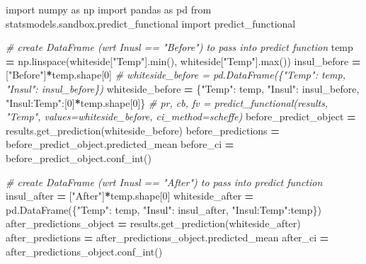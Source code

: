 \documentclass[
]{book}
\newenvironment{Shaded}{\begin{snugshade}}{\end{snugshade}}
\newcommand{\BuiltInTok}[1]{#1}
\newcommand{\CommentTok}[1]{\textcolor[rgb]{0.56,0.35,0.01}{\textit{#1}}}
\newcommand{\DecValTok}[1]{\textcolor[rgb]{0.00,0.00,0.81}{#1}}
\newcommand{\ImportTok}[1]{#1}
\newcommand{\NormalTok}[1]{#1}
\newcommand{\OperatorTok}[1]{\textcolor[rgb]{0.81,0.36,0.00}{\textbf{#1}}}
\newcommand{\StringTok}[1]{\textcolor[rgb]{0.31,0.60,0.02}{#1}}
\begin{document}
\begin{Shaded}
\begin{Highlighting}[]
\ImportTok{import}\NormalTok{ numpy }\ImportTok{as}\NormalTok{ np}
\ImportTok{import}\NormalTok{ pandas }\ImportTok{as}\NormalTok{ pd}
\ImportTok{from}\NormalTok{ statsmodels.sandbox.predict\_functional }\ImportTok{import}\NormalTok{ predict\_functional}

\CommentTok{\# create DataFrame (wrt Inusl == "Before") to pass into predict function}
\NormalTok{temp }\OperatorTok{=}\NormalTok{ np.linspace(whiteside[}\StringTok{"Temp"}\NormalTok{].}\BuiltInTok{min}\NormalTok{(), whiteside[}\StringTok{"Temp"}\NormalTok{].}\BuiltInTok{max}\NormalTok{())}
\NormalTok{insul\_before }\OperatorTok{=}\NormalTok{ [}\StringTok{"Before"}\NormalTok{]}\OperatorTok{*}\NormalTok{temp.shape[}\DecValTok{0}\NormalTok{]}
\CommentTok{\# whiteside\_before = pd.DataFrame(\{"Temp": temp, "Insul": insul\_before\})}
\NormalTok{whiteside\_before }\OperatorTok{=}\NormalTok{ \{}\StringTok{"Temp"}\NormalTok{: temp, }\StringTok{"Insul"}\NormalTok{: insul\_before, }\StringTok{"Insul:Temp"}\NormalTok{:[}\DecValTok{0}\NormalTok{]}\OperatorTok{*}\NormalTok{temp.shape[}\DecValTok{0}\NormalTok{]\}}
\CommentTok{\# pr, cb, fv = predict\_functional(results, "Temp", values=whiteside\_before, ci\_method=\textquotesingle{}scheffe\textquotesingle{})}
\NormalTok{before\_predict\_object }\OperatorTok{=}\NormalTok{ results.get\_prediction(whiteside\_before)}
\NormalTok{before\_predictions }\OperatorTok{=}\NormalTok{ before\_predict\_object.predicted\_mean}
\NormalTok{before\_ci }\OperatorTok{=}\NormalTok{ before\_predict\_object.conf\_int()}

\CommentTok{\# create DataFrame (wrt Inusl == "After") to pass into predict function}
\NormalTok{insul\_after }\OperatorTok{=}\NormalTok{ [}\StringTok{"After"}\NormalTok{]}\OperatorTok{*}\NormalTok{temp.shape[}\DecValTok{0}\NormalTok{]}
\NormalTok{whiteside\_after }\OperatorTok{=}\NormalTok{ pd.DataFrame(\{}\StringTok{"Temp"}\NormalTok{: temp, }\StringTok{"Insul"}\NormalTok{: insul\_after, }\StringTok{"Insul:Temp"}\NormalTok{:temp\})}
\NormalTok{after\_predictions\_object }\OperatorTok{=}\NormalTok{ results.get\_prediction(whiteside\_after)}
\NormalTok{after\_predictions }\OperatorTok{=}\NormalTok{ after\_predictions\_object.predicted\_mean}
\NormalTok{after\_ci }\OperatorTok{=}\NormalTok{ after\_predictions\_object.conf\_int()}


\end{Highlighting}
\end{Shaded}
\end{document}
